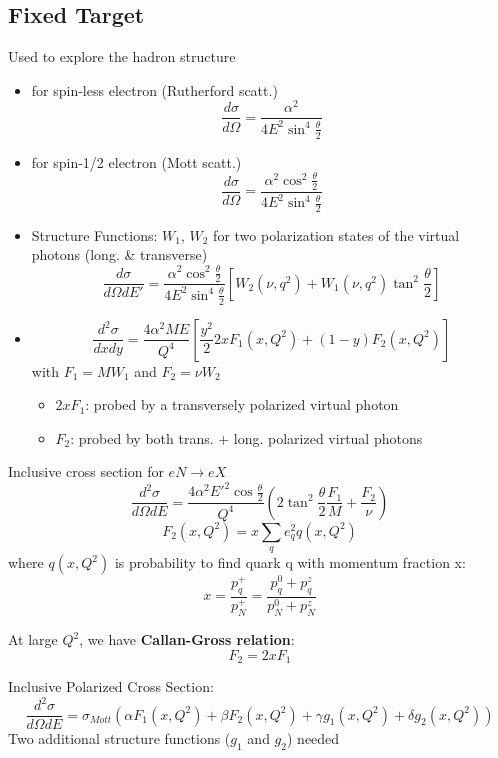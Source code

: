 \subsection{Fixed Target}
Used to explore the hadron structure
\begin{itemize}
    \item for spin-less electron (Rutherford scatt.)
	$$ \frac{d\sigma}{d\Omega} = \frac{\alpha^2}{4E^2\sin^4\frac{\theta}{2}}$$
    \item for spin-1/2 electron (Mott scatt.)
	$$ \frac{d\sigma}{d\Omega} = \frac{\alpha^2\cos^2\frac{\theta}{2}}{4E^2\sin^4\frac{\theta}{2}}$$
    \item Structure  Functions: $W_1$, $W_2$ for two polarization states of the virtual photons (long. \& transverse)
	$$ \frac{d\sigma}{d\Omega dE'} = \frac{\alpha^2\cos^2\frac{\theta}{2}}{4E^2\sin^4\frac{\theta}{2}}[ W_2(\nu, q^2) + W_1(\nu, q^2)\tan^2\frac{\theta}{2}] $$
    \item 
	$$ \frac{d^2\sigma}{dxdy} = \frac{4\alpha^2 ME}{Q^4}\left[ \frac{y^2}{2}2xF_1(x, Q^2) + (1-y)F_2(x, Q^2) \right]$$
	with $F_1 = MW_1$ and $F_2 = \nu W_2$
	\begin{itemize}
	    \item $2xF_1$: probed by a transversely polarized virtual photon
	    \item $F_2$: probed by both trans. + long. polarized virtual photons
	\end{itemize}

\end{itemize}

Inclusive cross section for $eN \rightarrow eX$
\begin{equation*}
    \frac{d^2\sigma}{d\Omega dE} = \frac{4\alpha^2E'^2\cos\frac{\theta}{2}}{Q^4}
    \left( 2\tan^2\frac{\theta}{2}\frac{F_1}{M} + \frac{F_2}{\nu} \right)
\end{equation*}
$$ F_2(x, Q^2) = x\sum_q e_q^2 q(x, Q^2)$$
where $q(x, Q^2)$ is probability to find quark q with momentum fraction x:
$$ x = \frac{p_q^+}{p_N^+} = \frac{p_q^0 + p_q^z}{p_N^0 + p_N^z} $$

At large $Q^2$, we have \textbf{Callan-Gross relation}: 
$$ F_2 = 2xF_1 $$

Inclusive Polarized Cross Section:
\begin{equation*}
    \frac{d^2\sigma}{d\Omega dE} = \sigma_{Mott}
    \left( \alpha F_1(x, Q^2) + \beta F_2(x, Q^2) + \gamma g_1(x, Q^2) + \delta g_2(x, Q^2) \right)
\end{equation*}
Two additional structure functions ($g_1$ and $g_2$) needed
